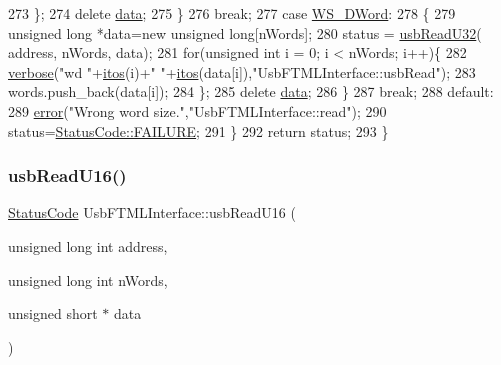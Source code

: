 \begin{DoxyCode}
273       \};
274       \textcolor{keyword}{delete} \hyperlink{namespaceshell_a5ea2525995cedc3efd69ea8a7f034d1e}{data};
275     \}
276     \textcolor{keywordflow}{break};
277   \textcolor{keywordflow}{case} \hyperlink{classUsbFTMLInterface_ae0f25daa336091a5acd548aef3e9b4b4abff203c40a75d695acbf9190ae2dbe69}{WS\_DWord}:
278     \{
279       \textcolor{keywordtype}{unsigned} \textcolor{keywordtype}{long} *data=\textcolor{keyword}{new} \textcolor{keywordtype}{unsigned} \textcolor{keywordtype}{long}[nWords];
280       status = \hyperlink{classUsbFTMLInterface_aa1256fc56698bc9ed1bcf11ecc6ff766}{usbReadU32}( address, nWords, data);
281       \textcolor{keywordflow}{for}(\textcolor{keywordtype}{unsigned} \textcolor{keywordtype}{int} i = 0; i < nWords; i++)\{
282         \hyperlink{classObject_a83d2db2df682907ea1115ad721c1c4a1}{verbose}(\textcolor{stringliteral}{"wd "}+\hyperlink{Tools_8h_af330027dbdafb9a30768b3613c553e60}{itos}(i)+\textcolor{stringliteral}{" "}+\hyperlink{Tools_8h_af330027dbdafb9a30768b3613c553e60}{itos}(data[i]),\textcolor{stringliteral}{"UsbFTMLInterface::usbRead"});
283         words.push\_back(data[i]);
284       \};
285       \textcolor{keyword}{delete} \hyperlink{namespaceshell_a5ea2525995cedc3efd69ea8a7f034d1e}{data};
286     \}
287     \textcolor{keywordflow}{break};
288   \textcolor{keywordflow}{default}:
289     \hyperlink{classObject_a204a95f57818c0f811933917a30eff45}{error}(\textcolor{stringliteral}{"Wrong word size."},\textcolor{stringliteral}{"UsbFTMLInterface::read"});
290     status=\hyperlink{classStatusCode_a6f565cbeadc76d14c72f047e5e85eb4ba3da73d4c469762eb9d3c960368252b26}{StatusCode::FAILURE};
291   \}
292   \textcolor{keywordflow}{return} status;
293 \}
\end{DoxyCode}
\mbox{\label{classUsbFTMLInterface_a5fb608bce418671265b61266033cedc0}} 
\subsubsection{\texorpdfstring{usb\+Read\+U16()}{usbReadU16()}}
{\footnotesize\ttfamily \hyperlink{classStatusCode}{Status\+Code} Usb\+F\+T\+M\+L\+Interface\+::usb\+Read\+U16 (\begin{DoxyParamCaption}\item[{unsigned long int}]{address,  }\item[{unsigned long int}]{n\+Words,  }\item[{unsigned short $\ast$}]{data }\end{DoxyParamCaption})}



